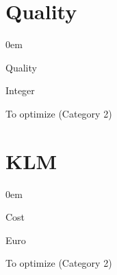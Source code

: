 \documentclass[a4paper, 11pt, notitlepage]{report}
\begin{document}
	\section{Quality}
	\begin{description}
	\itemsep0em
	\item[Property:]Quality
	\item[Unit:] Integer
	\item[Role:] To optimize  (Category 2)
	\end{description}
	
	\section{KLM}
	\begin{description}
	\itemsep0em
	\item[Property:] Cost
	\item[Unit:] Euro
	\item[Role:] To optimize  (Category 2)
	\end{description}
	\nopagebreak
\end{document}
